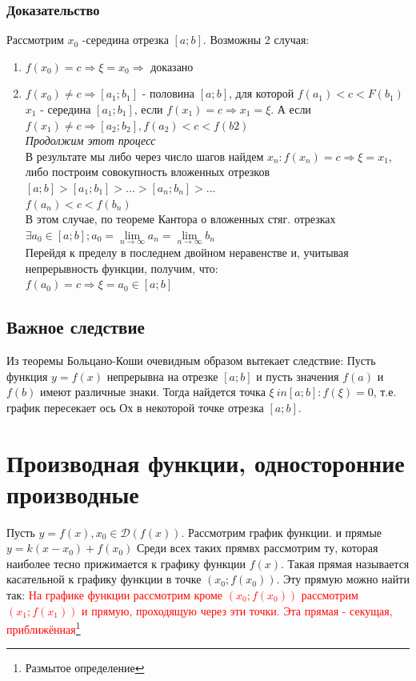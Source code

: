 \documentclass[oneside]{book}
\begin{document}
\begin{enumerate}
\subsection{Доказательство}
Рассмотрим $x_0$ -середина отрезка $[a;b]$. Возможны 2 случая:
\begin{enumerate}
\item $f(x_0)=c \Rightarrow \xi=x_0 \Rightarrow$ доказано
\item $f(x_0)\neq c \Rightarrow [a_1;b_1]$ - половина $[a;b]$, для которой $f(a_1)<c<F(b_1)$
$x_1$ - середина $[a_1;b_1]$, если $f(x_1)=c\Rightarrow x_1=\xi$. А если $f(x_1)\neq c \Rightarrow [a_2; b_2], f(a_2)<c<f(b2)$
\\\textit{Продолжим этот процесс}\\
В результате мы либо через число шагов найдем $x_n:f(x_n)=c\Rightarrow \xi=x_1$, либо построим совокупность вложенных отрезков $[a;b]>[a_1;b_1]>...>[a_n;b_n]>...$\\
$f(a_n)<c<f(b_n)$\\
В этом случае, по теореме Кантора о вложенных стяг. отрезках $\exists a_0 \in [a;b]; a_0=\lim \limits_{n \rightarrow \infty}a_n=\lim \limits_{n \rightarrow \infty}b_n$\\
Перейдя к пределу в последнем двойном неравенстве и, учитывая непрерывность функции, получим, что:\\
$f(a_0)=c\Rightarrow \xi=a_0 \in [a;b]$
\end{enumerate}
\section{Важное следствие}
Из теоремы Больцано-Коши очевидным образом вытекает следствие:
Пусть функция $y=f(x)$ непрерывна на отрезке $[a;b]$ и пусть значения $f(a)$ и $f(b)$ имеют различные знаки. Тогда найдется точка $\xi \ in [a;b]: f(\xi)=0$, т.е. график пересекает ось Ох в некоторой точке отрезка $[a;b]$.


\chapter{Производная функции, односторонние производные}

Пусть $y = f(x), x_0 \in \mathcal{D}(f(x))$. Рассмотрим график функции. и  прямые $y = k(x - x_0) + f(x_0)$
Среди всех таких прямвх рассмотрим ту, которая наиболее тесно прижимается к графику функции $f(x)$.
Такая прямая называется касательной к графику функции в точке $(x_0; f(x_0))$. Эту прямую можно найти так:
\textcolor{red}{На графике функции рассмотрим кроме $(x_0; f(x_0))$ рассмотрим $(x_1; f(x_1))$ и прямую, проходящую через эти точки. Эта прямая - секущая, приближённая\footnote{Размытое определение}}


\end{enumerate}
\end{document}

